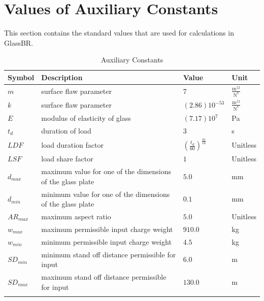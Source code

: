 \documentclass[12pt]{article}
\begin{document}
\section{Values of Auxiliary Constants}
\label{Sec:ValuofAuxiCons}
This section contains the standard values that are used for calculations in GlassBR.
\begin{longtabu}{l X[l] l l}
\toprule
Symbol & Description & Value & Unit
\\
\midrule
$m$ & surface flaw parameter & $7$ & $\frac{\text{m}^{12}}{\text{N}^{7}}$
\\
$k$ & surface flaw parameter & $\left(2.86\right) 10^{-53}$ & $\frac{\text{m}^{12}}{\text{N}^{7}}$
\\
$E$ & modulus of elasticity of glass & $\left(7.17\right) 10^{7}$ & Pa
\\
${t_{d}}$ & duration of load & $3$ & s
\\
$LDF$ & load duration factor & $\left(\frac{{t_{d}}}{60}\right)^{\frac{m}{16}}$ & Unitless
\\
$LSF$ & load share factor & $1$ & Unitless
\\
${d_{max}}$ & maximum value for one of the dimensions of the glass plate & $5.0$ & mm
\\
${d_{min}}$ & minimum value for one of the dimensions of the glass plate & $0.1$ & mm
\\
${AR_{max}}$ & maximum aspect ratio & $5.0$ & Unitless
\\
${w_{max}}$ & maximum permissible input charge weight & $910.0$ & kg
\\
${w_{min}}$ & minimum permissible input charge weight & $4.5$ & kg
\\
${SD_{min}}$ & minimum stand off distance permissible for input & $6.0$ & m
\\
${SD_{max}}$ & maximum stand off distance permissible for input & $130.0$ & m
\\
\bottomrule
\caption{Auxiliary Constants}
\label{Table:AuxiCons}
\end{longtabu}
\end{document}
